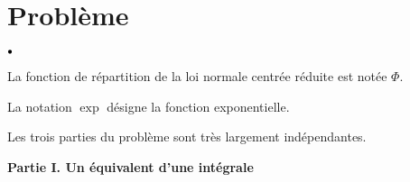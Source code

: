 \documentclass[11pt]{article}%
\begin{document}
\section*{Problème}

\begin{noliste}{$\scriptstyle \bullet$}
\item La fonction de répartition de la loi normale centrée réduite est
notée $\Phi$.

\item La notation $\exp$ désigne la fonction exponentielle.

\item Les trois parties du problème sont très largement indépendantes.
\end{noliste}



\textbf{Partie I. Un équivalent d'une intégrale}
\end{document}
